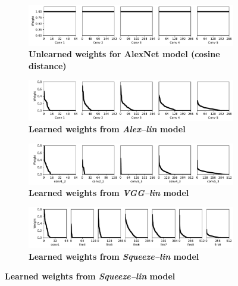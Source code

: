 \begin{figure}
\centering
\begin{subfigure}{1.\textwidth}
  \centering
  \includegraphics[width=1.\linewidth]{imgs/weights_subplotted_alex_ones.pdf}
  \vspace{-6mm}
  \caption{\textbf{Unlearned weights for AlexNet model (cosine distance)}}
  \label{fig:weights_ones}
\end{subfigure}

\begin{subfigure}{1.\textwidth}
  \centering
    \includegraphics[width=1.\linewidth]{imgs/weights_subplotted_alex.pdf}
    \vspace{-6mm}
    \caption{\textbf{Learned weights from \textit{Alex--lin} model}}
\label{fig:weights_learned}
\end{subfigure}

\begin{subfigure}{1.\textwidth}
  \centering
    \includegraphics[width=1.\linewidth]{imgs/weights_subplotted_vgg.pdf}
    \vspace{-6mm}
    \caption{\textbf{Learned weights from \textit{VGG--lin} model}}
\label{fig:weights_learned_vgg}
\end{subfigure}

\begin{subfigure}{1.\textwidth}
  \centering
    \includegraphics[width=1.\linewidth]{imgs/weights_subplotted_squeeze.pdf}
    \vspace{-6mm}
    \caption{\textbf{Learned weights from \textit{Squeeze--lin} model}}
\label{fig:weights_learned_squeeze}
\end{subfigure}


\end{figure}

